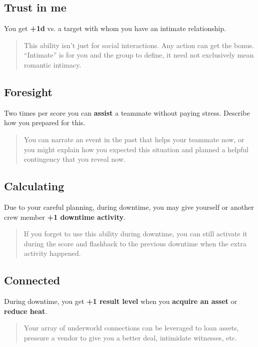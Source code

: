 \documentclass[11pt,fleqn,a5paper]{book}
\begin{document}
\subsection{Trust in me}

You get \textbf{+1d} vs. a target with whom you have an intimate relationship.

\begin{quote}
	This ability isn’t just for social interactions. Any action can get the bonus. “Intimate” is for you and the group to define, it need not exclusively mean romantic intimacy.
\end{quote} 

\subsection{Foresight}

Two times per score you can \textbf{assist} a teammate without paying stress. Describe how you prepared for this.

\begin{quote}
	You can narrate an event in the past that helps your teammate now, or you might explain how you expected this situation and planned a helpful contingency that you reveal now.
\end{quote} 

\subsection{Calculating}

Due to your careful planning, during downtime, you may give yourself or another crew member \textbf{+1 downtime activity}.

\begin{quote}
	If you forget to use this ability during downtime, you can still activate it during the score and flashback to the previous downtime when the extra activity happened.
\end{quote} 

\subsection{Connected}

During downtime, you get \textbf{+1 result level} when you \textbf{acquire an asset} or \textbf{reduce heat}.

\begin{quote}
	Your array of underworld connections can be leveraged to loan assets, pressure a vendor to give you a better deal, intimidate witnesses, etc.
\end{quote} 
\end{document}
